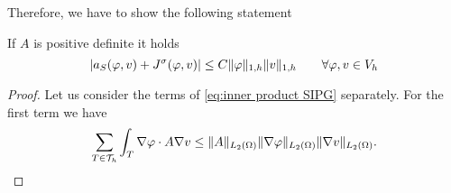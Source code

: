 Therefore, we have to show the following statement
\begin{lemma}\label{la: SIPG continuous}
	If $A$ is positive definite it holds
	\[
		|a_S(\varphi, v) + J^\sigma(\varphi,v)| \leq C \lVert \varphi \rVert_{1,h} \lVert v \rVert_{1,h} \qquad \forall \varphi,v \in V_h
	\]
\end{lemma}
\begin{proof}

Let us consider the terms of \eqref{eq:inner product SIPG} separately.
For the first term we have
\begin{align}
	\sum\limits_{T \in \mathcal{T}_h} \int_T \nabla \varphi \cdot A \nabla v \leq \lVert A \rVert_{L_2(\Omega)}  \lVert \nabla \varphi \rVert_{L_2(\Omega)} \lVert \nabla v \rVert_{L_2(\Omega)}. \label{eq: estimate first term}
\end{align}


\end{proof}
